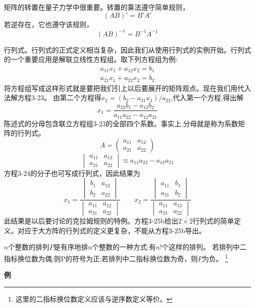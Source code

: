 矩阵的转置在量子力学中很重要。转置的乘法遵守简单规则，
\[(AB)'=B'A' \tag{3-21}\]
若逆存在，它也遵守该规则，
\[(AB)^{-1}=B^{-1}A^{-1} \tag{3-22}\]

行列式。行列式的正式定义相当复杂，因此我们从使用行列式的实例开始。行列式的一个重要应用是解联立线性方程组。取下列方程组为例:
\[
\begin{array}{c}
    a_{11}x_1+a_{12}x_2=b_1 \\
    a_{21}x_1+a_{22}x_2=b_2
\end{array}    
\tag{3-23}
\]
将方程组写成这样形式就是要把我们引上以后要展开的矩阵观点。现在我们用代入法解方程3-23。
由第二个方程得$x_2=(b_2-a_{21}x_1)/a_{22}$,代入第一个方程,得出解
\[x_1=\frac{a_{22}b_1-a_{12}b_2}{a_{11}a_{22}-a_{12}a_{21}} \tag{3-24}\]
陈述式的分母包含联立方程组3-23的全部四个系数。事实上,分母就是称为系数矩阵的行列式。
\[A=
\begin{pmatrix}
    a_{11} & a_{12} \\
    a_{21} & a_{22} 
\end{pmatrix}
\tag{3-25a}
\]
\[
\begin{vmatrix}
    a_{11} & a_{12} \\
    a_{21} & a_{22} 
\end{vmatrix} 
\equiv
a_{11}a_{22}-a_{12}a_{21}
\tag{3-25b}
\]
方程3-24的分子也可写成行列式，因此结果为
\[
x_1=
\frac{
\begin{vmatrix}
    b_1 & a_{12} \\
    b_2 & a_{22} 
\end{vmatrix} 
}
{
\begin{vmatrix}
    a_{11} & a_{12} \\
    a_{21} & a_{22} 
\end{vmatrix} 
}   
\qquad 
x_2=
\frac{
\begin{vmatrix}
    a_{11} & b_1 \\
    a_{21} & b_2 
\end{vmatrix} 
}
{
\begin{vmatrix}
    a_{11} & a_{12} \\
    a_{21} & a_{22} 
\end{vmatrix} 
} 
\tag{3-26}
\]
此结果是以后要讨论的克拉姆规则的特例。方程3-25b给出$2 \times 2$行列式的简单定义。对应于大方阵的行列式的定义更复杂，不能从方程3-25b导出。
\begin{definition}[排列]
    $n$个整数的排列$P$是有序地排$n$个整数的一种方式;有$n!$个这样的排列。
    若排列中二指标换位数为偶;则P的符号为正;若排列中二指标换位数为奇，则$P$为负。
    \footnote{这里的二指标换位数定义应该与逆序数定义等价。}
\end{definition}
\textbf{例}

